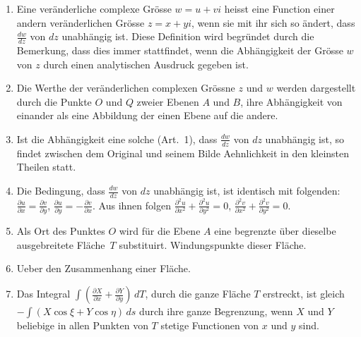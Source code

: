 \documentclass[a4paper,12pt]{article}
\begin{document}
\begin{enumerate}
\item
Eine ver\"{a}nderliche complexe Gr\"{o}sse $w = u + vi$ heisst
eine Function einer andern ver\"{a}nderlichen Gr\"{o}sse
$z = x + yi$, wenn sie mit ihr sich so \"{a}ndert, dass
$\displaystyle \frac{dw}{dz}$
von $dz$ unabh\"{a}ngig ist.  Diese Definition wird begr\"{u}ndet
durch die Bemerkung, dass dies immer stattfindet, wenn die
Abh\"{a}ngigkeit der Gr\"{o}sse $w$ von $z$ durch einen
analytischen Ausdruck gegeben ist.

\item
Die Werthe der ver\"{a}nderlichen complexen Gr\"{o}ssne $z$ und
$w$ werden dargestellt durch die Punkte $O$ und $Q$ zweier Ebenen
$A$ und $B$, ihre Abh\"{a}ngigkeit von einander als eine
Abbildung der einen Ebene auf die andere.

\item
Ist die Abh\"{a}ngigkeit eine solche (Art.~1), dass
$\displaystyle \frac{dw}{dz}$
von $dz$ unabh\"{a}ngig ist, so findet zwischen dem Original und
seinem Bilde Aehnlichkeit in den kleinsten Theilen statt.

\item
Die Bedingung, dass
$\displaystyle \frac{dw}{dz}$
von $dz$ unabh\"{a}ngig ist, ist identisch mit folgenden:
$\displaystyle
   \frac{\partial u}{\partial x} =   \frac{\partial v}{\partial y}$,
$\displaystyle
   \frac{\partial u}{\partial y} = - \frac{\partial v}{\partial x}$.
Aus ihnen folgen
$\displaystyle
   \frac{\partial^2 u}{\partial x^2}
      + \frac{\partial^2 u}{\partial y^2}
   = 0$,
$\displaystyle
   \frac{\partial^2 v}{\partial x^2}
      + \frac{\partial^2 v}{\partial y^2}
   = 0$.

\item
Als Ort des Punktes $O$ wird f\"{u}r die Ebene $A$ eine begrenzte
\"{u}ber dieselbe ausgebreitete Fl\"{a}che~$T$ substituirt.
Windungspunkte dieser Fl\"{a}che.

\item
Ueber den Zusammenhang einer Fl\"{a}che.

\item
Das Integral
$\displaystyle \int
      \left(
         \frac{\partial X}{\partial x}
       + \frac{\partial Y}{\partial y}
      \right) \, dT$,
durch die ganze Fl\"{a}che $T$ erstreckt, ist gleich
$\displaystyle - \int
      (X \cos \xi + Y \cos \eta) \, ds$
durch ihre ganze Begrenzung, wenn $X$ und $Y$ beliebige in allen
Punkten von $T$ stetige Functionen von $x$ und $y$ sind.


\end{enumerate}
\end{document}
